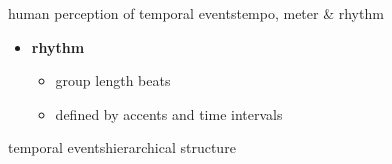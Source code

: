 \begin{frame}{human perception of temporal events}{tempo, meter \& rhythm}
\begin{itemize}
\begin{itemize}
                        \item	typically 3 to 7 beats (app.\ \unit[5]{s})
                    \end{itemize}
                
                \smallskip                
                \item<3->	\textbf{rhythm}
                    \begin{itemize}
                        \item	group length \unit[1--8]{beats}
                        \item	defined by accents and time intervals
                    \end{itemize}
            \end{itemize}
        \end{frame}
        
        \begin{frame}{temporal events}{hierarchical structure}
        \end{frame}

